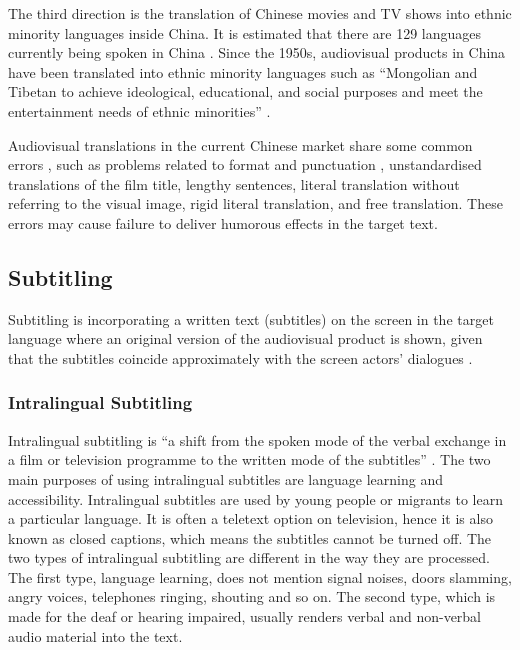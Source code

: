 \documentclass[english]{textolivre}
\begin{document}
The third direction is the translation of Chinese movies and TV shows into ethnic minority languages inside China. It is estimated that there are 129 languages currently being spoken in China \cite{sun__2007}. Since the 1950s, audiovisual products in China have been translated into ethnic minority languages such as “Mongolian and Tibetan to achieve ideological, educational, and social purposes and meet the entertainment needs of ethnic minorities” \cite[p. 28]{jin_comparative_2018}.   

Audiovisual translations in the current Chinese market share some common errors \cite{jin_comparative_2018}, such as problems related to format and punctuation \cite{jing_problems_2019}, unstandardised translations of the film title, lengthy sentences, literal translation without referring to the visual image, rigid literal translation, and free translation. These errors may cause failure to deliver humorous effects in the target text. 

\subsection{Subtitling}\label{sec-organizacao}
Subtitling is incorporating a written text (subtitles) on the screen in the target language where an original version of the audiovisual product is shown, given that the subtitles coincide approximately with the screen actors' dialogues \cite{gambier_position_2013}.

\subsubsection{Intralingual Subtitling}\label{sec-organizacao-latex}
Intralingual subtitling is “a shift from the spoken mode of the verbal exchange in a film or television programme to the written mode of the subtitles” \cite[p. 273]{gambier_position_2013}. The two main purposes of using intralingual subtitles are language learning and accessibility. Intralingual subtitles are used by young people or migrants to learn a particular language. It is often a teletext option on television, hence it is also known as closed captions, which means the subtitles cannot be turned off. The two types of intralingual subtitling are different in the way they are processed. The first type, language learning, does not mention signal noises, doors slamming, angry voices, telephones ringing, shouting and so on. The second type, which is made for the deaf or hearing impaired, usually renders verbal and non-verbal audio material into the text.
\end{document}
